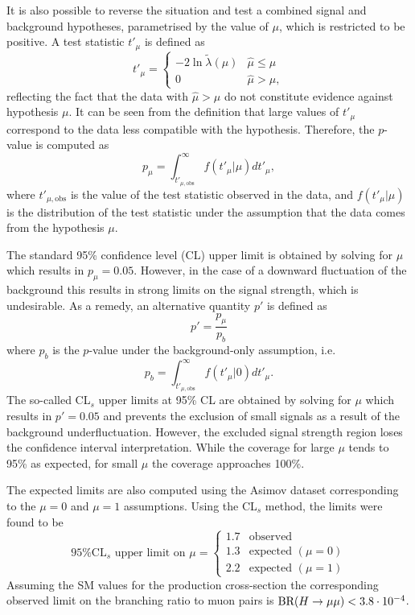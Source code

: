It is also possible to reverse the situation and test a combined signal
and background hypotheses, parametrised by the value of $\mu$, which is
restricted to be positive. A test statistic $t'_\mu$ is defined as
\begin{equation}
t'_\mu =
    \begin{cases}
     -2\ln{\tilde\lambda(\mu)} & \hat\mu \leq \mu \\
     0                         & \hat\mu > \mu,
    \end{cases}
\end{equation}
reflecting the fact that the data with $\hat\mu > \mu$ do not constitute
evidence against hypothesis $\mu$. It can be seen from the definition
that large values of $t'_\mu$ correspond to the data less compatible with the
hypothesis. Therefore, the $p$-value is computed as
\begin{equation}
p_\mu = \int_{t'_{\mu, \text{obs}}}^{\infty} f(t'_\mu | \mu) d t'_\mu,
\end{equation}
where $t'_{\mu, \text{obs}}$ is the value of the test statistic observed
in the data, and $f(t'_\mu | \mu)$ is the distribution of the test statistic
under the assumption that the data comes from the hypothesis $\mu$.

The standard 95\% confidence level (CL) upper limit is obtained by solving
for $\mu$ which results in $p_\mu = 0.05$. However, in the case of a downward
fluctuation of the background this results in strong limits on the signal strength,
which is undesirable. As a remedy, an alternative quantity $p'$ is defined as
\begin{equation}
p' = \frac{p_\mu}{p_b}
\end{equation}
where $p_b$ is the $p$-value under the background-only assumption,
i.e.
\begin{equation}
p_b = \int_{t'_{\mu, \text{obs}}}^{\infty} f(t'_\mu | 0) d t'_\mu.
\end{equation}
The so-called CL$_s$ upper limits at 95\% CL are obtained by solving for $\mu$ which
results in $p' = 0.05$ \cite{Cowan:2010js, 0954-3899-28-10-313} and
prevents the exclusion of small signals as
a result of the background underfluctuation. However, the excluded signal
strength region loses the confidence interval interpretation. While the
coverage for large $\mu$ tends to 95\% as expected, for small $\mu$ the
coverage approaches 100\%.

The expected limits are also computed using the Asimov dataset
corresponding to the $\mu=0$ and $\mu=1$ assumptions. Using the CL$_s$
method, the limits were found to be
\begin{equation}
\text{95\% CL$_s$ upper limit on $\mu$} =
    \begin{cases}
     1.7 & \text{observed } \\
     1.3 & \text{expected } (\mu = 0) \\
     2.2 & \text{expected } (\mu = 1)
    \end{cases}
\end{equation}
Assuming the SM values for the production cross-section the corresponding
observed limit on the branching ratio to muon pairs is
$\text{BR}(H \rightarrow \mu\mu) < 3.8 \cdot 10^{-4}$.

